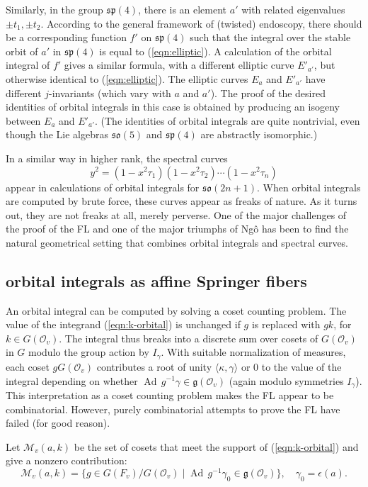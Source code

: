 \documentclass[brochure,english,12pt]{bourbaki}
\def\op#1{{\operatorname{#1}}}
\def\so{\mathfrak{so}}
\def\sp{\mathfrak{sp}}
\def\g{\mathfrak{g}}
\def\M{{\mathcal M}}
\def\O{{\mathcal O}}
\begin{document}
Similarly, in the group $\sp(4)$, there is an element ${{a'}}$ with
related eigenvalues $\pm t_1,\pm t_2$.  According to the general
framework of (twisted) endoscopy, there should be a corresponding
function $f'$ on $\sp(4)$ such that the integral over the stable orbit
of ${{a'}}$ in $\sp(4)$ is equal to (\ref{eqn:elliptic}).  A
calculation of the orbital integral of $f'$ gives a similar formula,
with a different elliptic curve $E'_{{a'}}$, but otherwise identical to
(\ref{eqn:elliptic}).  The elliptic curves $E_a$ and $E'_{{a'}}$ have
different $j$-invariants (which vary with $a$ and ${{a'}}$).  The proof
of the desired identities of orbital integrals in this case is
obtained by producing an isogeny between $E_a$ and $E'_{{a'}}$.  (The
identities of orbital integrals are quite nontrivial, even though the
Lie algebras $\so(5)$ and $\sp(4)$ are abstractly isomorphic.)

In a similar way in higher rank,  the spectral curves
\[
y^2 = (1-x^2 \tau_1)(1-x^2 \tau_2)\cdots (1-x^2 \tau_n)
\]
appear  in calculations of orbital integrals for
$\so(2n+1)$.  When orbital integrals are computed by brute force,
these curves appear as freaks of nature.  As it turns
out, they are not freaks at all, merely perverse.  One of the major
challenges of the proof of the FL and one of the major
triumphs of Ng\^o has been to find the natural geometrical setting that combines
orbital integrals and spectral curves.


\subsection{orbital integrals as affine Springer fibers}\label{sec:coset}

An orbital integral can be computed by solving a coset counting
problem.  The value of the integrand (\ref{eqn:k-orbital}) is unchanged if $g$ is replaced
with $g k$, for $k\in G(\O_v)$.  The integral thus breaks into a
discrete sum over cosets of $G(\O_v)$ in $G$ modulo the group action
by $I_\gamma$.  With suitable normalization of measures, each coset
$g G(\O_v)$ contributes a root of unity $\langle\kappa,\gamma\rangle$ or $0$ 
to the value of the integral depending on whether $\op{Ad}\,g^{-1}\gamma \in
\g(\O_v)$ (again modulo symmetries $I_\gamma$).  This interpretation as a
coset counting problem makes the FL appear to be combinatorial.
However, purely combinatorial attempts to prove the FL have failed (for good reason).

Let $\M_v(a,k)$ be the set of cosets that meet the support of (\ref{eqn:k-orbital})
 and give a nonzero contribution:
\[
\M_v(a,k) = \{g\in G(F_v)/G(\O_v) \mid \op{Ad}\,g^{-1} \gamma_0 \in \g(\O_v)\}, 
\quad \gamma_0 = \epsilon(a).
\]
\end{document}
